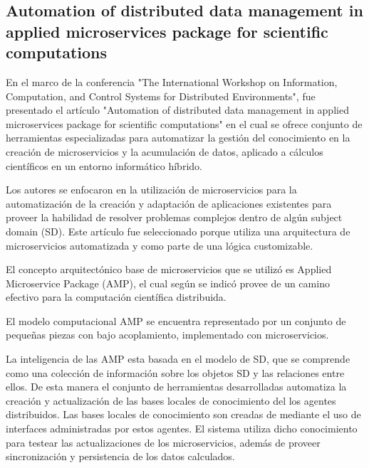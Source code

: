 \subsection{Automation of distributed data management in applied
            microservices package for scientific computations
}

En el marco de la conferencia
"The International Workshop on Information, Computation, and Control Systems for Distributed Environments",
fue presentado el artículo "Automation of distributed data management in applied
microservices package for scientific computations"\cite{oparin_automation_2020} en el cual se ofrece conjunto de herramientas especializadas para automatizar la gestión del conocimiento en
la creación de microservicios y la acumulación de datos, aplicado a
cálculos científicos en un entorno informático híbrido.\par

Los autores se enfocaron en la utilización de microservicios para la automatización de la creación y adaptación de aplicaciones existentes para proveer la habilidad de resolver problemas complejos dentro de algún subject domain (SD).
Este artículo fue seleccionado porque utiliza una arquitectura de microservicios automatizada y como parte de una
lógica customizable.\par

El concepto arquitectónico base de microservicios que se utilizó es Applied Microservice Package (AMP),
el cual según se indicó provee de un camino efectivo para la computación científica distribuida.\par

El modelo computacional AMP se encuentra representado por un conjunto de pequeñas piezas con bajo acoplamiento,
implementado con microservicios.\par

La inteligencia de las AMP esta basada en el modelo de SD,
que se comprende como una colección de información sobre los objetos SD y las relaciones entre ellos.
De esta manera el conjunto de herramientas desarrolladas automatiza la creación y actualización
de las bases locales de conocimiento del los agentes distribuidos. Las bases locales de conocimiento
son creadas de mediante el uso de interfaces administradas por estos agentes.
El sistema utiliza dicho conocimiento para testear las actualizaciones de los microservicios,
además de proveer sincronización y persistencia de los datos calculados.\par

